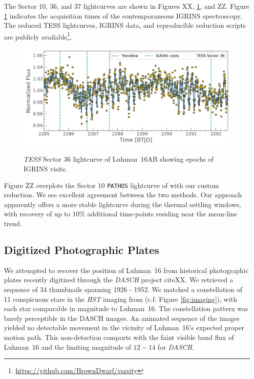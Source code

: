 \documentclass[modern]{aastex631}
\begin{document}
The Sector 10, 36, and 37 lightcurves are shown in Figures XX, \ref{fig:Sector36}, and ZZ.  Figure \ref{fig:Sector36} indicates the acquisition times of the contemporaneous IGRINS spectroscopy.  The reduced TESS lightcurves, IGRINS data, and reproducible reduction scripts are publicly available\footnote{\url{https://github.com/BrownDwarf/varsity}}.

\begin{figure}[ht]
  \centering
    \includegraphics[width=\textwidth]{figures/TESS_S36_O1_IGRINS_overlay.png} \\
\caption{\emph{TESS} Sector 36 lightcurve of Luhman~16AB showing epochs of IGRINS visits.}
\label{fig:Sector36}
\end{figure}

Figure ZZ overplots the Sector 10 \texttt{PATHOS} lightcurve of \citet{2021ApJ...906...64A} with our custom reduction.  We see excellent agreement between the two methods.  Our approach apparently offers a more stable lightcurve during the thermal settling windows, with recovery of up to $10\%$ additional time-points residing near the mean-line trend.

\subsection{Digitized Photographic Plates}
We attempted to recover the position of Luhman~16 from historical photographic plates recently digitized through the \emph{DASCH} project citeXX.  We retrieved a sequence of 34 thumbnails spanning 1926 - 1952.  We matched a constellation of 11 conspicuous stars in the \emph{HST} imaging from \citet{2017MNRAS.470.1140B} (c.f. Figure \ref{fig:imaging}), with each star comparable in magnitude to Luhman~16.  The constellation pattern was barely perceptible in the DASCH images.  An animated sequence of the images yielded no detectable movement in the vicinity of Luhman~16's expected proper motion path.  This non-detection comports with the faint visible band flux of Luhman~16 and the limiting magnitude of $12-14$ for \emph{DASCH}.
\end{document}

